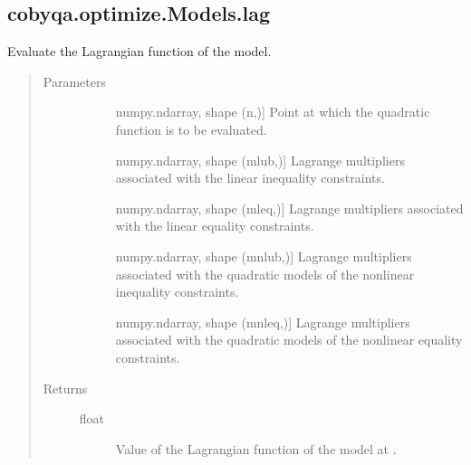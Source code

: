 \documentclass[letterpaper,10pt,english]{sphinxmanual}
\begin{document}
\begin{fulllineitems}
\subsection{cobyqa.optimize.Models.lag}
\label{\detokenize{refs/generated/cobyqa.optimize.Models.lag:cobyqa-optimize-models-lag}}\label{\detokenize{refs/generated/cobyqa.optimize.Models.lag::doc}}

\begin{fulllineitems}
\label{\detokenize{refs/generated/cobyqa.optimize.Models.lag:cobyqa.optimize.Models.lag}}
\sphinxAtStartPar
Evaluate the Lagrangian function of the model.
\begin{quote}\begin{description}
\item[{Parameters}] \leavevmode\begin{description}
\item[{}] \leavevmode{[}numpy.ndarray, shape (n,){]}
\sphinxAtStartPar
Point at which the quadratic function is to be evaluated.

\item[{}] \leavevmode{[}numpy.ndarray, shape (mlub,){]}
\sphinxAtStartPar
Lagrange multipliers associated with the linear inequality
constraints.

\item[{}] \leavevmode{[}numpy.ndarray, shape (mleq,){]}
\sphinxAtStartPar
Lagrange multipliers associated with the linear equality
constraints.

\item[{}] \leavevmode{[}numpy.ndarray, shape (mnlub,){]}
\sphinxAtStartPar
Lagrange multipliers associated with the quadratic models of the
nonlinear inequality constraints.

\item[{}] \leavevmode{[}numpy.ndarray, shape (mnleq,){]}
\sphinxAtStartPar
Lagrange multipliers associated with the quadratic models of the
nonlinear equality constraints.

\end{description}

\item[{Returns}] \leavevmode\begin{description}
\item[{float}] \leavevmode
\sphinxAtStartPar
Value of the Lagrangian function of the model at .


\end{description}
\end{description}
\end{quote}
\end{fulllineitems}
\end{fulllineitems}
\end{document}
